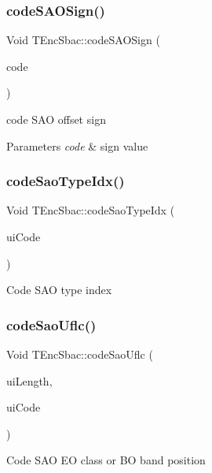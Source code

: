 \subsubsection{\texorpdfstring{code\+S\+A\+O\+Sign()}{codeSAOSign()}}
{\footnotesize\ttfamily Void T\+Enc\+Sbac\+::code\+S\+A\+O\+Sign (\begin{DoxyParamCaption}\item[{U\+Int}]{code }\end{DoxyParamCaption})}

code S\+AO offset sign 
\begin{DoxyParams}{Parameters}
{\em code} & sign value \\
\hline
\end{DoxyParams}
\mbox{\label{class_t_enc_sbac_a5fbbc6be456647da34f384d849510ea1}} 
\subsubsection{\texorpdfstring{code\+Sao\+Type\+Idx()}{codeSaoTypeIdx()}}
{\footnotesize\ttfamily Void T\+Enc\+Sbac\+::code\+Sao\+Type\+Idx (\begin{DoxyParamCaption}\item[{U\+Int}]{ui\+Code }\end{DoxyParamCaption})}

Code S\+AO type index \mbox{\label{class_t_enc_sbac_a637015d5f4aae12d8de10c3df8f49b3c}} 
\subsubsection{\texorpdfstring{code\+Sao\+Uflc()}{codeSaoUflc()}}
{\footnotesize\ttfamily Void T\+Enc\+Sbac\+::code\+Sao\+Uflc (\begin{DoxyParamCaption}\item[{U\+Int}]{ui\+Length,  }\item[{U\+Int}]{ui\+Code }\end{DoxyParamCaption})}

Code S\+AO EO class or BO band position \mbox{\label{class_t_enc_sbac_a5c9fdfcd499e653a46457d376a0b8680}} 

